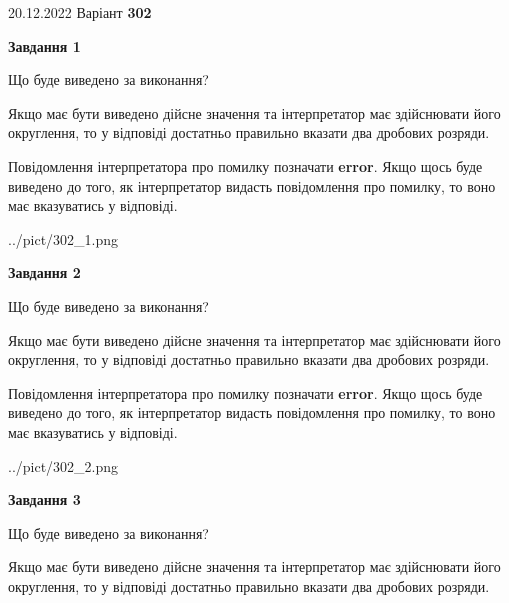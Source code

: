 \documentclass[12pt, ukrainian]{article}
\begin{document}
{20.12.2022 Варіант \No \textbf { 302 }\par}
{
\begin {Large}

{\begin {center}\textbf{Завдання 1}\end {center}}\par
Що буде виведено за виконання? \par

Якщо має бути виведено дійсне значення та інтерпретатор має здійснювати його округлення, 
то у відповіді достатньо правильно вказати два дробових розряди.

Повідомлення інтерпретатора про помилку позначати \textbf{error}.
Якщо щось буде виведено до того, як інтерпретатор видасть повідомлення про помилку, 
то воно має вказуватись у відповіді. \par

\begin{center}
	{../pict/302_1.png}
\end{center}
\newpage

{\begin {center}\textbf{Завдання 2}\end {center}}\par
Що буде виведено за виконання? \par

Якщо має бути виведено дійсне значення та інтерпретатор має здійснювати його округлення, 
то у відповіді достатньо правильно вказати два дробових розряди.

Повідомлення інтерпретатора про помилку позначати \textbf{error}.
Якщо щось буде виведено до того, як інтерпретатор видасть повідомлення про помилку, 
то воно має вказуватись у відповіді. \par

\begin{center}
	{../pict/302_2.png}
\end{center}
\newpage

{\begin {center}\textbf{Завдання 3}\end {center}}\par
Що буде виведено за виконання? \par

Якщо має бути виведено дійсне значення та інтерпретатор має здійснювати його округлення, 
то у відповіді достатньо правильно вказати два дробових розряди.


\end{Large}}
\end{document}
